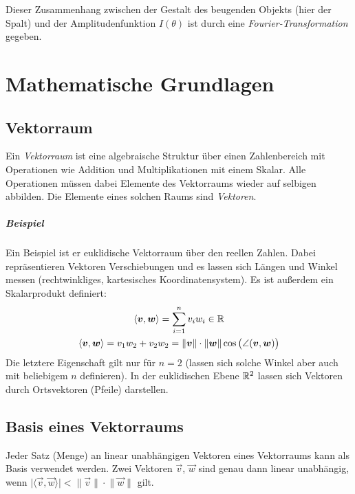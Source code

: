 	Dieser Zusammenhang zwischen der Gestalt des beugenden Objekts (hier der Spalt) und der Amplitudenfunktion \( I(\theta) \) ist durch eine \emph{Fourier-Transformation} gegeben.

	\section{Mathematische Grundlagen}
		\subsection{Vektorraum}
			Ein \emph{Vektorraum} ist eine algebraische Struktur über einen Zahlenbereich mit Operationen wie Addition und Multiplikationen mit einem Skalar. Alle Operationen müssen dabei Elemente des Vektorraums wieder auf selbigen abbilden. Die Elemente eines solchen Raums sind \emph{Vektoren}.
			
			\subparagraph{Beispiel}
				Ein Beispiel ist er euklidische Vektorraum über den reellen Zahlen. Dabei repräsentieren Vektoren Verschiebungen und es lassen sich Längen und Winkel messen (rechtwinkliges, kartesisches Koordinatensystem). Es ist außerdem ein Skalarprodukt definiert:
				\begin{gather*}
					\langle \bm{v}, \bm{w} \rangle = \sum_{i = 1}^{n} v_i w_i \in \mathbb{R} \\
					\langle \bm{v}, \bm{w} \rangle = v_1 w_2 + v_2 w_2 = \lVert \bm{v} \rVert \cdot \lVert \bm{w} \rVert \cos \big( \angle(\bm{v}, \bm{w}) \big)
				\end{gather*}
				Die letztere Eigenschaft gilt nur für \( n = 2 \) (\iA lassen sich solche Winkel aber auch mit beliebigem \(n\) definieren). In der euklidischen Ebene \( \mathbb{R}^2 \) lassen sich Vektoren durch Ortsvektoren (Pfeile) darstellen.

		\subsection{Basis eines Vektorraums}
			Jeder Satz (Menge) an linear unabhängigen Vektoren eines Vektorraums kann als Basis verwendet werden. Zwei Vektoren \(\vec{v}\), \(\vec{w}\) sind genau dann linear unabhängig, wenn \( \big\lvert \langle \vec{v}, \vec{w} \rangle \big\rvert < \lVert \vec{v} \rVert \cdot \lVert \vec{w} \rVert \) gilt.
		
